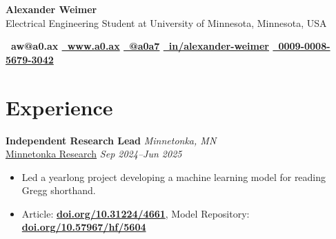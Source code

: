 \documentclass[11pt, letterpaper]{article}
\begin{document}
\vspace{2em}
\begin{center}
\vspace{2em}
\color{black}\huge{\titlefont\textbf{Alexander Weimer}} \\
\vspace{0.4em}
\small{Electrical Engineering Student at University of Minnesota, Minnesota, USA} \\
\vspace{0.5em}

\small{\textbf{
  ~aw@a0.ax
  \quad
  \href{https://a0.ax/}{~www.a0.ax}
  \quad
  \href{https://github.com/a0a7}{~@a0a7}
  \quad
  \href{https://linkedin.com/in/alexander-weimer}{~in/alexander-weimer}
  \quad
  \href{https://orcid.org/0009-0008-5679-3042}{~0009-0008-5679-3042}
}}

\end{center}

\vspace{-1.5em}
\section{\Large{Experience}}

\noindent\textbf{{Independent Research Lead}} \hfill \textit{Minnetonka, MN}\\
\href{https://www.linkedin.com/school/minnetonka-research/}{Minnetonka Research} \hfill \textit{Sep 2024--Jun 2025}
\begin{itemize}
\item Led a yearlong project developing a machine learning model for reading Gregg shorthand.
\item Article: \textbf{\href{https://doi.org/10.31224/4661}{doi.org/10.31224/4661}}, Model Repository: \textbf{\href{https://doi.org/10.57967/hf/5604}{doi.org/10.57967/hf/5604}}
\end{itemize}
\end{document}

